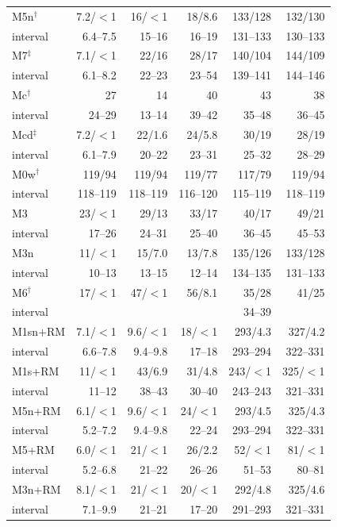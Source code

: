 \documentclass[pdflatex,sn-basic]{sn-jnl}
\begin{document}
\begin{table}[p]
\begin{tabular}{@{}lrrrrr@{}}
M5n$^\dagger$ & 7.2/$<$1 & 16/$<$1 & 18/8.6 & 133/128 & 132/130 \\
\quad interval & 6.4--7.5 & 15--16 & 16--19 & 131--133 & 130--133 \\
M7$^\ddagger$ & 7.1/$<$1 & 22/16 & 28/17 & 140/104 & 144/109 \\
\quad interval & 6.1--8.2 & 22--23 & 23--54 & 139--141 & 144--146 \\
Mc$^\dagger$ & 27 & 14 & 40 & 43 & 38 \\
\quad interval & 24--29 & 13--14 & 39--42 & 35--48 & 36--45 \\
Mcd$^\ddagger$ & 7.2/$<$1 & 22/1.6 & 24/5.8 & 30/19 & 28/19 \\
\quad interval & 6.1--7.9 & 20--22 & 23--31 & 25--32 & 28--29 \\
M0w$^\dagger$ & 119/94 & 119/94 & 119/77 & 117/79 & 119/94 \\
\quad interval & 118--119 & 118--119 & 116--120 & 115--119 & 118--119 \\
M3 & 23/$<$1 & 29/13 & 33/17 & 40/17 & 49/21 \\
\quad interval & 17--26 & 24--31 & 25--40 & 36--45 & 45--53 \\
M3n & 11/$<$1 & 15/7.0 & 13/7.8 & 135/126 & 133/128 \\
\quad interval & 10--13 & 13--15 & 12--14 & 134--135 & 131--133 \\
M6$^\dagger$ & 17/$<$1 & 47/$<$1 & 56/8.1 & 35/28 & 41/25 \\
\quad interval &  &  &  & 34--39 & \\
M1sn+RM & 7.1/$<$1 & 9.6/$<$1 & 18/$<$1 & 293/4.3 & 327/4.2 \\
\quad interval & 6.6--7.8 & 9.4--9.8 & 17--18 & 293--294 & 322--331 \\
M1s+RM & 11/$<$1 & 43/6.9 & 31/4.8 & 243/$<$1 & 325/$<$1 \\
\quad interval & 11--12 & 38--43 & 30--40 & 243--243 & 321--331 \\
M5n+RM & 6.1/$<$1 & 9.6/$<$1 & 24/$<$1 & 293/4.5 & 325/4.3 \\
\quad interval & 5.2--7.2 & 9.4--9.8 & 22--24 & 293--294 & 322--331 \\
M5+RM & 6.0/$<$1 & 21/$<$1 & 26/2.2 & 52/$<$1 & 81/$<$1 \\
\quad interval & 5.2--6.8 & 21--22 & 26--26 & 51--53 & 80--81 \\
M3n+RM & 8.1/$<$1 & 21/$<$1 & 20/$<$1 & 292/4.8 & 325/4.6 \\
\quad interval & 7.1--9.9 & 21--21 & 17--20 & 291--293 & 321--331 \\

\end{tabular}
\end{table}
\end{document}
